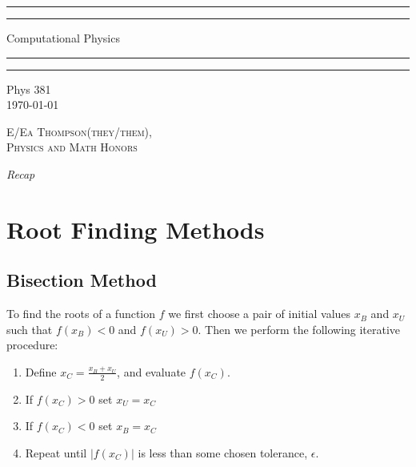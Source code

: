 \documentclass[12pt]{report}
\begin{document}

\begin{titlepage}
    \centering
    \scshape
    \vspace*{\baselineskip}
    \rule{\textwidth}{1.6pt}\vspace*{-\baselineskip}\vspace*{2pt}
    \rule{\textwidth}{0.4pt}
    
    \vspace{0.75\baselineskip}
    
    {\LARGE Computational Physics}
    
    \vspace{0.75\baselineskip}
    
    \rule{\textwidth}{0.4pt}\vspace*{-\baselineskip}\vspace{3.2pt}
    \rule{\textwidth}{1.6pt}
    
    \vspace{2\baselineskip}
    Phys 381 \\
    \vspace*{3\baselineskip}
    \monthdayyeardate\today \\
    \vspace*{5.0\baselineskip}
    
    {\scshape\Large E/Ea Thompson(they/them), \\ Physics and Math Honors\\}
    
    \vspace{1.0\baselineskip}
    \textit{Recap}
\end{titlepage}

\tableofcontents


\chapter{Root Finding Methods}



\section{Bisection Method}

\begin{proc}{}{}
	To find the roots of a function $f$ we first choose a pair of initial values $x_B$ and $x_U$ such that $f(x_B) < 0$ and $f(x_U) > 0$. Then we perform the following iterative procedure:
	\begin{enumerate}
		\item Define $x_C = \frac{x_B+x_U}{2}$, and evaluate $f(x_C)$.
		\item If $f(x_C) > 0$ set $x_U = x_C$
		\item If $f(x_C) < 0$ set $x_B = x_C$
		\item Repeat until $|f(x_C)|$ is less than some chosen tolerance, $\epsilon$.
	\end{enumerate}
\end{proc}
\end{document}
